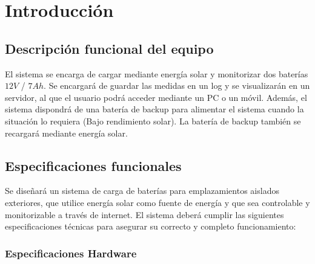 \section{Introducción}

\subsection{Descripción funcional del equipo}

El sistema se encarga de cargar mediante energía solar y monitorizar dos baterías $12 V$ / $7 Ah$. Se encargará de guardar las medidas en un log y se visualizarán en un servidor, al que el usuario podrá acceder mediante un PC o un móvil. Además, el sistema dispondrá de una batería de backup para alimentar el sistema cuando la situación lo requiera (Bajo rendimiento solar). La batería de backup también se recargará mediante energía solar.


\subsection{Especificaciones funcionales}

Se diseñará un sistema de carga de baterías para emplazamientos aislados exteriores, que utilice energía solar como fuente de energía y que sea controlable y monitorizable a través de internet. El sistema deberá cumplir las siguientes especificaciones técnicas para asegurar su correcto y completo funcionamiento:

\subsubsection{Especificaciones Hardware}

